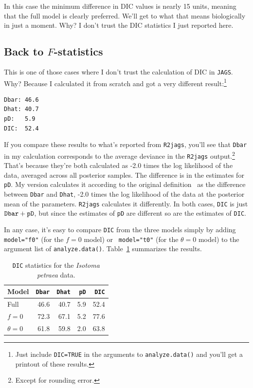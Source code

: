 In this case the minimum difference in DIC values is nearly 15 units,
meaning that the full model is clearly preferred. We'll get to what
that means biologically in just a moment. Why? I don't trust the DIC
statistics I just reported here.

\subsection*{Back to $F$-statistics}

This is one of those cases where I don't trust the calculation of DIC
in {\tt JAGS}. Why? Because I calculated it from scratch and got a
very different result:\footnote{Just include {\tt DIC=TRUE} in the
  arguments to {\tt analyze.data()} and you'll get a printout of these
  results.}
\begin{verbatim}
Dbar: 46.6
Dhat: 40.7
pD:   5.9
DIC:  52.4
\end{verbatim}
If you compare these results to what's reported from {\tt R2jags},
you'll see that {\tt Dbar} in my calculation corresponds to the
average deviance in the {\tt R2jags} output.\footnote{Except for
  rounding error.} That's because they're both calculated as -2.0
times the log likelihood of the data, averaged across all posterior
samples. The difference is in the estimates for {\tt pD}. My version
calculates it according to the original
definition~\cite{Spiegelhalter-etal-2002} as the difference between
{\tt Dbar} and {\tt Dhat}, -2.0 times the log likelihood of the data
at the posterior mean of the parameters. {\tt R2jags} calculates it
differently. In both cases, {\tt DIC} is just $\mbox{\tt
  Dbar}+\mbox{\tt pD}$, but since the estimates of {\tt pD} are
different so are the estimates of {\tt DIC}.

In any case, it's easy to compare {\tt DIC} from the three models
simply by adding {\tt model="f0"} (for the $f=0$ model) or {\tt
  model="t0"} (for the $\theta=0$ model) to the argument list of
{\tt analyze.data()}. Table~\ref{table:isotoma-DIC} summarizes the
results.

\begin{table}
\begin{center}
\begin{tabular}{l|rrrr}
\hline\hline
Model & {\tt Dbar} & {\tt Dhat} & {\tt pD} & {\tt DIC} \\
\hline
Full  & 46.6 & 40.7 & 5.9 & 52.4 \\
$f=0$ & 72.3 & 67.1 & 5.2 & 77.6 \\
$\theta=0$ & 61.8 & 59.8 & 2.0 & 63.8 \\
\hline
\end{tabular}
\end{center}
\caption{{\tt DIC} statistics for the {\it Isotoma petraea\/} data.}\label{table:isotoma-DIC}
\end{table}

